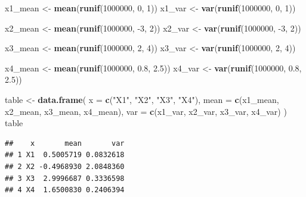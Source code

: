 \documentclass[
]{article}
\newenvironment{Shaded}{\begin{snugshade}}{\end{snugshade}}
\newcommand{\DataTypeTok}[1]{\textcolor[rgb]{0.13,0.29,0.53}{#1}}
\newcommand{\DecValTok}[1]{\textcolor[rgb]{0.00,0.00,0.81}{#1}}
\newcommand{\FloatTok}[1]{\textcolor[rgb]{0.00,0.00,0.81}{#1}}
\newcommand{\KeywordTok}[1]{\textcolor[rgb]{0.13,0.29,0.53}{\textbf{#1}}}
\newcommand{\NormalTok}[1]{#1}
\newcommand{\StringTok}[1]{\textcolor[rgb]{0.31,0.60,0.02}{#1}}
\begin{document}
\begin{Shaded}
\begin{Highlighting}[]
\NormalTok{x1\_mean \textless{}{-}}\StringTok{ }\KeywordTok{mean}\NormalTok{(}\KeywordTok{runif}\NormalTok{(}\DecValTok{1000000}\NormalTok{, }\DecValTok{0}\NormalTok{, }\DecValTok{1}\NormalTok{))}
\NormalTok{x1\_var \textless{}{-}}\StringTok{ }\KeywordTok{var}\NormalTok{(}\KeywordTok{runif}\NormalTok{(}\DecValTok{1000000}\NormalTok{, }\DecValTok{0}\NormalTok{, }\DecValTok{1}\NormalTok{))}

\NormalTok{x2\_mean \textless{}{-}}\StringTok{ }\KeywordTok{mean}\NormalTok{(}\KeywordTok{runif}\NormalTok{(}\DecValTok{1000000}\NormalTok{, }\DecValTok{{-}3}\NormalTok{, }\DecValTok{2}\NormalTok{))}
\NormalTok{x2\_var \textless{}{-}}\StringTok{ }\KeywordTok{var}\NormalTok{(}\KeywordTok{runif}\NormalTok{(}\DecValTok{1000000}\NormalTok{, }\DecValTok{{-}3}\NormalTok{, }\DecValTok{2}\NormalTok{))}

\NormalTok{x3\_mean \textless{}{-}}\StringTok{ }\KeywordTok{mean}\NormalTok{(}\KeywordTok{runif}\NormalTok{(}\DecValTok{1000000}\NormalTok{, }\DecValTok{2}\NormalTok{, }\DecValTok{4}\NormalTok{))}
\NormalTok{x3\_var \textless{}{-}}\StringTok{ }\KeywordTok{var}\NormalTok{(}\KeywordTok{runif}\NormalTok{(}\DecValTok{1000000}\NormalTok{, }\DecValTok{2}\NormalTok{, }\DecValTok{4}\NormalTok{))}

\NormalTok{x4\_mean \textless{}{-}}\StringTok{ }\KeywordTok{mean}\NormalTok{(}\KeywordTok{runif}\NormalTok{(}\DecValTok{1000000}\NormalTok{, }\FloatTok{0.8}\NormalTok{, }\FloatTok{2.5}\NormalTok{))}
\NormalTok{x4\_var \textless{}{-}}\StringTok{ }\KeywordTok{var}\NormalTok{(}\KeywordTok{runif}\NormalTok{(}\DecValTok{1000000}\NormalTok{, }\FloatTok{0.8}\NormalTok{, }\FloatTok{2.5}\NormalTok{))}

\NormalTok{table \textless{}{-}}\StringTok{ }\KeywordTok{data.frame}\NormalTok{(}
  \DataTypeTok{x =} \KeywordTok{c}\NormalTok{(}\StringTok{"X1"}\NormalTok{, }\StringTok{"X2"}\NormalTok{, }\StringTok{"X3"}\NormalTok{, }\StringTok{"X4"}\NormalTok{),}
  \DataTypeTok{mean =} \KeywordTok{c}\NormalTok{(x1\_mean, x2\_mean, x3\_mean, x4\_mean),}
  \DataTypeTok{var =} \KeywordTok{c}\NormalTok{(x1\_var, x2\_var, x3\_var, x4\_var)}
\NormalTok{)}
\NormalTok{table}
\end{Highlighting}
\end{Shaded}

\begin{verbatim}
##    x       mean       var
## 1 X1  0.5005719 0.0832618
## 2 X2 -0.4968930 2.0848360
## 3 X3  2.9996687 0.3336598
## 4 X4  1.6500830 0.2406394
\end{verbatim}
\end{document}
